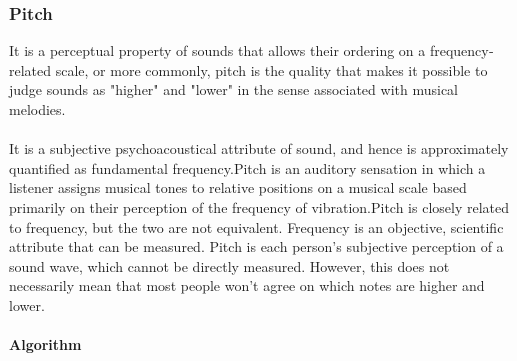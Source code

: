 \subsubsection{Pitch}
It is a perceptual property of sounds that allows their ordering on a frequency­related scale, or 
more commonly, pitch is the quality that makes it possible to judge sounds as "higher" and "lower" in 
the sense associated with musical melodies.\\  
\\
It is a subjective psychoacoustical attribute of sound, and hence is approximately quantified 
as fundamental frequency.Pitch is an auditory sensation in which a listener assigns musical tones to 
relative positions on a musical scale based primarily on their perception of the frequency of 
vibration.Pitch is closely related to frequency, but the two are not equivalent. Frequency is an 
objective, scientific attribute that can be measured. Pitch is each person's subjective perception  of a 
sound wave, which cannot be directly measured. However, this does not necessarily mean that most 
people won't agree on which notes are higher and lower.\\ 
\\
\textbf{Algorithm}
